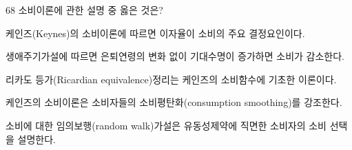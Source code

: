 \begin{question}{68}
소비이론에 관한 설명 중 옳은 것은?
\begin{choices}
  \item 케인즈(Keynes)의 소비이론에 따르면 이자율이 소비의 주요 결정요인이다.
  \item 생애주기가설에 따르면 은퇴연령의 변화 없이 기대수명이 증가하면 소비가 감소한다.
  \item 리카도 등가(Ricardian equivalence)정리는 케인즈의 소비함수에 기초한 이론이다.
  \item 케인즈의 소비이론은 소비자들의 소비평탄화(consumption smoothing)를 강조한다.
  \item 소비에 대한 임의보행(random walk)가설은 유동성제약에 직면한 소비자의 소비 선택을 설명한다.
\end{choices}
\end{question}
